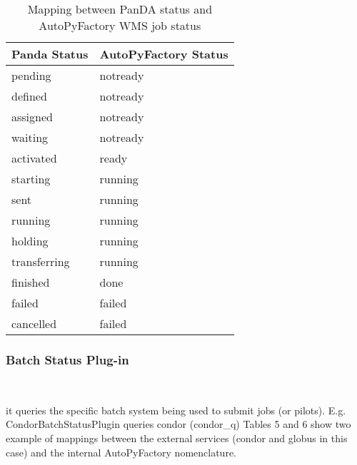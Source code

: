 \documentclass[a4paper]{jpconf}
\begin{document}
\begin{table}
   \begin{center}
      \begin{tabular}{l l}
         \hline
         \textbf{Panda Status} & \textbf{AutoPyFactory Status}       \\
         \hline
         pending       & notready  \\ 
         defined       & notready  \\ 
         assigned      & notready  \\ 
         waiting       & notready  \\ 
         activated     & ready     \\ 
         starting      & running   \\ 
         sent          & running   \\ 
         running       & running   \\ 
         holding       & running   \\ 
         transferring  & running   \\ 
         finished      & done      \\ 
         failed        & failed    \\ 
         cancelled     & failed    \\ 
         \hline
      \end{tabular}
   \end{center}
   \caption{Mapping between PanDA status and AutoPyFactory WMS job status}
   \label{translation}
\end{table}


\subsubsection{Batch Status Plug-in}

~

\noindent it queries the specific batch system being used to submit jobs (or pilots). 
E.g. CondorBatchStatusPlugin queries condor (condor\_q)
Tables 5 and 6 show two example of mappings between the external services (condor and globus in this case)
and the internal AutoPyFactory nomenclature.
\end{document}
